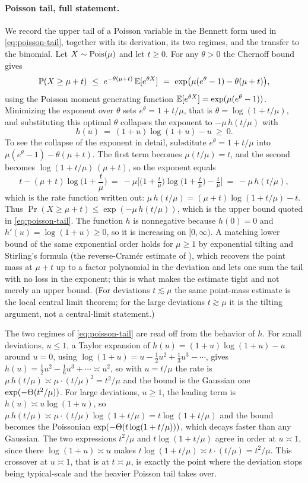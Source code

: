 \paragraph{Poisson tail, full statement.}
We record the upper tail of a Poisson variable in the Bennett form used in \eqref{eq:poisson-tail}, together with its
derivation, its two regimes, and the transfer to the binomial. Let $X\sim\mathrm{Pois}(\mu)$ and let $t\ge0$. For any $\theta>0$ the
Chernoff bound gives
\[
  \Pr(X\ge\mu+t)\ \le\ e^{-\theta(\mu+t)}\,\E[e^{\theta X}]\ =\ \exp\!\big(\mu(e^{\theta}-1)-\theta(\mu+t)\big),
\]
using the Poisson moment generating function $\mathbb{E}[e^{\theta X}]=\exp(\mu(e^{\theta}-1))$. Minimizing the exponent over
$\theta$ sets $e^{\theta}=1+t/\mu$, that is $\theta=\log(1+t/\mu)$, and substituting this optimal $\theta$ collapses the
exponent to $-\mu\,h(t/\mu)$ with
\[
  h(u)\ =\ (1+u)\log(1+u)-u\ \ge\ 0 .
\]
To see the collapse of the exponent in detail, substitute $e^{\theta}=1+t/\mu$ into $\mu(e^{\theta}-1)-\theta(\mu+t)$. The
first term becomes $\mu(t/\mu)=t$, and the second becomes $\log(1+t/\mu)\,(\mu+t)$, so the exponent equals
\[
  t-(\mu+t)\log\!\Big(1+\frac t\mu\Big)\ =\ -\mu\Big[\big(1+\tfrac t\mu\big)\log\big(1+\tfrac t\mu\big)-\tfrac t\mu\Big]\ =\ -\mu\,h(t/\mu),
\]
which is the rate function written out: $\mu\,h(t/\mu)=(\mu+t)\log(1+t/\mu)-t$.
Thus $\Pr(X\ge\mu+t)\le\exp(-\mu\,h(t/\mu))$, which is the upper bound quoted in \eqref{eq:poisson-tail}. The function $h$ is
nonnegative because $h(0)=0$ and $h'(u)=\log(1+u)\ge0$, so it is increasing on $[0,\infty)$. A matching lower bound of the
same exponential order holds for $\mu\ge1$ by exponential tilting and Stirling's formula (the reverse-Cram\'er estimate of
), which recovers the point mass at $\mu+t$ up to a factor polynomial in the deviation and lets one
sum the tail with no loss in the exponent; this is what makes the estimate tight and not merely an upper bound. (For
deviations $t\lesssim\mu$ the same point-mass estimate is the local central limit theorem; for the large deviations
$t\gtrsim\mu$ it is the tilting argument, not a central-limit statement.)

The two regimes of \eqref{eq:poisson-tail} are read off from the behavior of $h$. For small deviations, $u\le1$, a Taylor
expansion of $h(u)=(1+u)\log(1+u)-u$ around $u=0$, using $\log(1+u)=u-\tfrac12u^2+\tfrac13u^3-\cdots$, gives
$h(u)=\tfrac12 u^2-\tfrac16u^3+\cdots\asymp u^2$, so with $u=t/\mu$ the rate is $\mu\,h(t/\mu)\asymp\mu\cdot(t/\mu)^2=t^2/\mu$
and the bound is the Gaussian one $\exp(-\Theta(t^2/\mu))$. For large deviations, $u\ge1$, the leading term is $h(u)\asymp
u\log(1+u)$, so $\mu\,h(t/\mu)\asymp\mu\cdot(t/\mu)\log(1+t/\mu)=t\log(1+t/\mu)$ and the bound becomes the Poissonian
$\exp(-\Theta(t\log(1+t/\mu)))$, which decays faster than any Gaussian. The two expressions $t^2/\mu$ and $t\log(1+t/\mu)$ agree
in order at $u\asymp1$, since there $\log(1+u)\asymp u$ makes $t\log(1+t/\mu)\asymp t\cdot(t/\mu)=t^2/\mu$. This crossover at
$u\asymp1$, that is at $t\asymp\mu$, is exactly the point where the deviation stops being typical-scale and the heavier
Poisson tail takes over.

